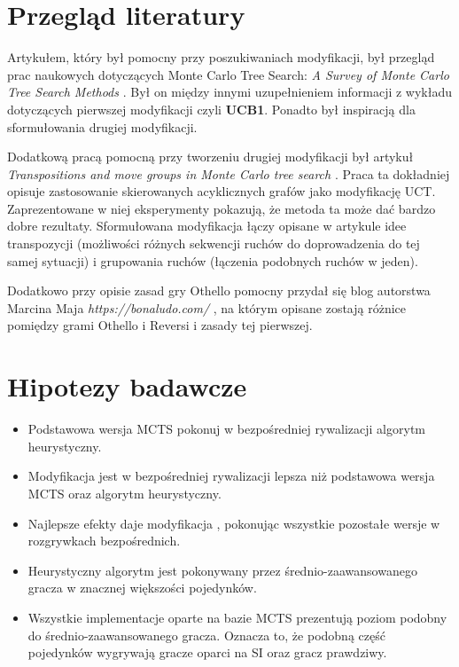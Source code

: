 \documentclass[10pt]{article}
\begin{document}
\section{Przegląd literatury}
Artykułem, który był pomocny przy poszukiwaniach modyfikacji, był przegląd prac naukowych dotyczących Monte Carlo Tree Search: \textit{A Survey of Monte Carlo Tree Search Methods} \cite{review}. Był on między innymi uzupełnieniem informacji z wykładu dotyczących pierwszej modyfikacji czyli \textbf{UCB1}. Ponadto był inspiracją dla sformułowania drugiej modyfikacji.

Dodatkową pracą pomocną przy tworzeniu drugiej modyfikacji był artykuł \textit{Transpositions and move groups in Monte Carlo tree search
} \cite{transposition}.  Praca ta dokładniej opisuje zastosowanie skierowanych acyklicznych grafów  jako modyfikację UCT. Zaprezentowane w niej eksperymenty pokazują, że metoda ta może dać bardzo dobre rezultaty. Sformułowana modyfikacja łączy opisane w artykule idee transpozycji (możliwości różnych sekwencji ruchów do doprowadzenia do tej samej sytuacji) i grupowania ruchów (łączenia podobnych ruchów w jeden).

Dodatkowo przy opisie zasad gry Othello pomocny przydał się blog autorstwa Marcina Maja \textit{https://bonaludo.com/} \cite{Othello}, na którym opisane zostają różnice pomiędzy grami Othello i Reversi i zasady tej pierwszej.
\section{Hipotezy badawcze}
\begin{itemize}
    \item Podstawowa wersja MCTS pokonuj w bezpośredniej rywalizacji algorytm heurystyczny.
    \item Modyfikacja  jest w bezpośredniej rywalizacji lepsza niż podstawowa wersja MCTS oraz algorytm heurystyczny.
    \item Najlepsze efekty daje modyfikacja , pokonując wszystkie pozostałe wersje w rozgrywkach bezpośrednich.
    \item Heurystyczny algorytm jest pokonywany przez średnio-zaawansowanego gracza w znacznej większości pojedynków.
    \item Wszystkie implementacje oparte na bazie MCTS prezentują poziom podobny do średnio-zaawansowanego gracza. Oznacza to, że podobną część pojedynków wygrywają gracze oparci na SI oraz gracz prawdziwy.
\end{itemize}
\end{document}
